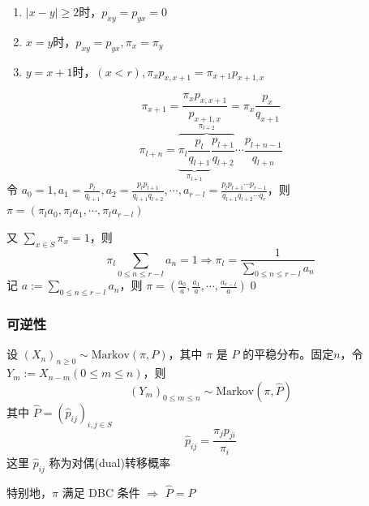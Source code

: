 \begin{enumerate}
    \item $|x-y|\geq 2$时，$p_{xy}=p_{yx}=0$
    \item $x=y$时，$p_{xy}=p_{yx},\pi_x=\pi_y$
    \item $y=x+1$时，$(x<r),\pi_x p_{x,x+1}=\pi_{x+1}p_{x+1,x}$
\end{enumerate}
\[
\pi_{x+1}=\frac{\pi_x p_{x,x+1}}{p_{x+1,x}}=\pi_x\frac{p_x}{q_{x+1}}
\]
\[
\pi_{l+n}=\overbrace{\underbrace{\pi_l\frac{p_l}{q_{l+1}}}_{\pi_{l+1}} \frac{p_{l+1}}{q_{l+2}}}^{\pi_{l+2}}\cdots \frac{p_{l+n-1}}{q_{l+n}}
\]
令 $a_0=1,a_1=\frac{p_l}{q_{l+1}},a_2=\frac{p_l p_{l+1}}{q_{l+1} q_{l+2}},\cdots,a_{r-l}=\frac{p_lp_{l+1}\cdots p_{r-1}}{q_{l+1}q_{l+2}\cdots q_r}$，则 $\pi=(\pi_l a_0,\pi_l a_1,\cdots, \pi_l a_{r-l})$

又 $\sum_{x\in S}\pi_x=1$，则
\[
\pi_l\sum_{0\leq n\leq r-l}a_n=1\Rightarrow \pi_l=\frac{1}{\sum_{0\leq n\leq r-l}a_n}
\]
记 $a:=\sum_{0\leq n\leq r-l}a_n$，则 $\pi=(\frac{a_0}{a},\frac{a_1}{a},\cdots,\frac{a_{r-l}}{a})$\qed

\subsubsection{可逆性}

\begin{theorem}
    设 $(X_n)_{n\geq 0}\sim \text{Markov}(\pi,P)$，其中 $\pi$ 是 $P$ 的平稳分布。固定$n$，令 $Y_m:=X_{n-m}(0\leq m\leq n)$，则
    \[
    (Y_m)_{0\leq m\leq n}\sim\text{Markov}(\pi,\hat{P})
    \]
    其中 $\hat{P}=(\hat{p}_{ij})_{i,j\in S}$
    \[
    \hat{p}_{ij}=\frac{\pi_j p_{ji}}{\pi_i}
    \]
    这里 $\hat{p}_{ij}$ 称为对偶(dual)转移概率
\end{theorem}

\begin{corollary}
    特别地，$\pi$ 满足 DBC 条件 $\Rightarrow$ $\hat{P}=P$
\end{corollary}